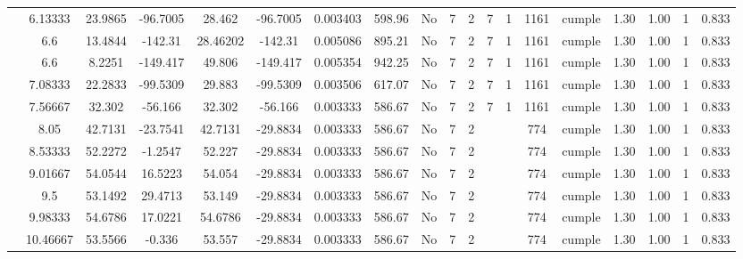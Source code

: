 \begin{table}[H]
{\begin{tabular}{|c|c|c|c|c|c|r|c|c|c|c|c|c|c|c|c|c|c|c|}
\cline{2-19}    & 6.13333 & 23.9865 & -96.7005 & 28.462 & -96.7005 & 0.003403 & 598.96 & No  & 7   & 2   & 7   & 1   & 1161 & \cellcolor[rgb]{ .776,  .937,  .808}cumple & 1.30 & 1.00 & 1   & 0.833 \bigstrut\\
\cline{2-19}    & \cellcolor[rgb]{ .851,  .882,  .949}6.6 & 13.4844 & -142.31 & 28.46202 & -142.31 & 0.005086 & 895.21 & No  & 7   & 2   & 7   & 1   & 1161 & \cellcolor[rgb]{ .776,  .937,  .808}cumple & 1.30 & 1.00 & 1   & 0.833 \bigstrut\\
\cline{2-19}    & \cellcolor[rgb]{ .851,  .882,  .949}6.6 & 8.2251 & -149.417 & 49.806 & -149.417 & 0.005354 & 942.25 & No  & 7   & 2   & 7   & 1   & 1161 & \cellcolor[rgb]{ .776,  .937,  .808}cumple & 1.30 & 1.00 & 1   & 0.833 \bigstrut\\
\cline{2-19}    & 7.08333 & 22.2833 & -99.5309 & 29.883 & -99.5309 & 0.003506 & 617.07 & No  & 7   & 2   & 7   & 1   & 1161 & \cellcolor[rgb]{ .776,  .937,  .808}cumple & 1.30 & 1.00 & 1   & 0.833 \bigstrut\\
\cline{2-19}    & 7.56667 & 32.302 & -56.166 & 32.302 & -56.166 & 0.003333 & 586.67 & No  & 7   & 2   & 7   & 1   & 1161 & \cellcolor[rgb]{ .776,  .937,  .808}cumple & 1.30 & 1.00 & 1   & 0.833 \bigstrut\\
\cline{2-19}    & 8.05 & 42.7131 & -23.7541 & 42.7131 & -29.8834 & 0.003333 & 586.67 & No  & 7   & 2   &     &     & 774 & \cellcolor[rgb]{ .776,  .937,  .808}cumple & 1.30 & 1.00 & 1   & 0.833 \bigstrut\\
\cline{2-19}    & 8.53333 & 52.2272 & -1.2547 & 52.227 & -29.8834 & 0.003333 & 586.67 & No  & 7   & 2   &     &     & 774 & \cellcolor[rgb]{ .776,  .937,  .808}cumple & 1.30 & 1.00 & 1   & 0.833 \bigstrut\\
\cline{2-19}    & 9.01667 & 54.0544 & 16.5223 & 54.054 & -29.8834 & 0.003333 & 586.67 & No  & 7   & 2   &     &     & 774 & \cellcolor[rgb]{ .776,  .937,  .808}cumple & 1.30 & 1.00 & 1   & 0.833 \bigstrut\\
\cline{2-19}    & 9.5 & 53.1492 & 29.4713 & 53.149 & -29.8834 & 0.003333 & 586.67 & No  & 7   & 2   &     &     & 774 & \cellcolor[rgb]{ .776,  .937,  .808}cumple & 1.30 & 1.00 & 1   & 0.833 \bigstrut\\
\cline{2-19}    & 9.98333 & 54.6786 & 17.0221 & 54.6786 & -29.8834 & 0.003333 & 586.67 & No  & 7   & 2   &     &     & 774 & \cellcolor[rgb]{ .776,  .937,  .808}cumple & 1.30 & 1.00 & 1   & 0.833 \bigstrut\\
\cline{2-19}    & 10.46667 & 53.5566 & -0.336 & 53.557 & -29.8834 & 0.003333 & 586.67 & No  & 7   & 2   &     &     & 774 & \cellcolor[rgb]{ .776,  .937,  .808}cumple & 1.30 & 1.00 & 1   & 0.833 \bigstrut\\

\end{tabular}}
\end{table}
